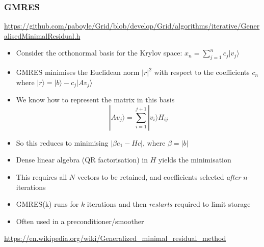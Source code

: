\documentclass[pdf,ps,8pt]{beamer}
\newcommand{\link}[1]{\href{#1}{ {\color{blue} #1} }}
\begin{document}
  \begin{frame}[fragile]\small\frametitle{ GMRES}

    \link{https://github.com/paboyle/Grid/blob/develop/Grid/algorithms/iterative/GeneralisedMinimalResidual.h}
    
    \begin{itemize}
    \item Consider the orthonormal basis for the Krylov space: $x_n = \sum\limits_{j=1}^n c_j | v_j\rangle $
      \item GMRES minimises the Euclidean norm $|r|^2$ with respect to the coefficients $c_n$ where $|r\rangle = |b\rangle - c_j | A v_j\rangle$
    \item We know how to represent the matrix in this basis
    $$
        | A v_j \rangle =  \sum\limits_{i=1}^{j+1}  | v_i \rangle H_{ij}
    $$
        \item So this reduces to minimising $|\beta e_1 - H c |$, where $\beta = |b|$
      \item Dense linear algebra (QR factorisation) in $H$ yields the minimisation
      \item This requires all $N$ vectors to be retained, and coefficients selected \emph{after} $n$-iterations
    \item GMRES(k) runs for $k$ iterations and then \emph{restarts} required to limit storage
    \item Often used in a preconditioner/smoother
    \end{itemize}

    \href{https://en.wikipedia.org/wiki/Generalized_minimal_residual_method}{{\color{blue}https://en.wikipedia.org/wiki/Generalized\_minimal\_residual\_method}}

    
  \end{frame}
\end{document}
